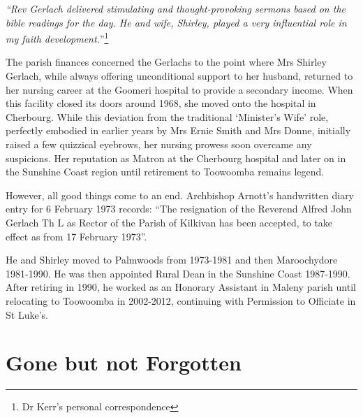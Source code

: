 \emph{``Rev Gerlach delivered stimulating and thought-provoking sermons based on the bible readings for the day. He and wife, Shirley, played a very influential role in my faith development.}''\footnote{Dr Kerr's personal correspondence}


The parish finances concerned the Gerlachs to the point where Mrs Shirley Gerlach, while always offering unconditional support to her husband, returned to her nursing career at the Goomeri hospital to provide a secondary income. When this facility closed its doors around 1968, she moved onto the hospital in Cherbourg. While this deviation from the traditional `Minister's Wife' role, perfectly embodied in earlier years by Mrs Ernie Smith and Mrs Donne, initially raised a few quizzical eyebrows, her nursing prowess soon overcame any suspicions. Her reputation as Matron at the Cherbourg hospital and later on in the Sunshine Coast region until retirement to Toowoomba remains legend.



However, all good things come to an end. Archbishop Arnott's handwritten diary entry for 6 February 1973 records: ``The resignation of the Reverend Alfred John Gerlach Th L as Rector of the Parish of Kilkivan has been accepted, to take effect as from 17 February 1973''.



He and Shirley moved to Palmwoods from 1973-1981 and then Maroochydore 1981-1990. He was then appointed Rural Dean in the Sunshine Coast 1987-1990. After retiring in 1990, he worked as an Honorary Assistant in Maleny parish until relocating to Toowoomba in 2002-2012, continuing with Permission to Officiate in St Luke's.



\section{Gone but not Forgotten}



